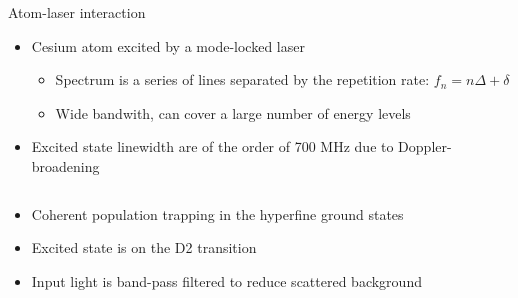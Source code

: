 \begin{block}{Atom-laser interaction}
  \begin{itemize}
  \item Cesium atom excited by a mode-locked laser
    \begin{itemize}
    \item Spectrum is a series of lines separated by the repetition rate: $f_n = n \Delta + \delta$
    \item Wide bandwith, can cover a large number of energy levels
    \end{itemize}
  \item Excited state linewidth are of the order of 700 MHz due to Doppler-broadening
  \end{itemize}
  \begin{columns}
    \begin{column}{0.49\textwidth}
      \begin{figure}
        \begin{center}
          \setlength\fboxsep{0pt}
          \setlength\fboxrule{0.5pt}
        \end{center}
      \end{figure}
      \begin{itemize}
      \item Coherent population trapping in the hyperfine ground states
      \item Excited state is on the D2 transition
      \item Input light is band-pass filtered to reduce scattered background

\end{itemize}
\end{column}
\end{columns}
\end{block}
